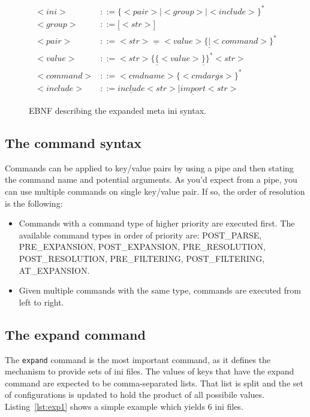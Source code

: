 \documentclass[11pt]{article}
\begin{document}
\begin{figure}
\begin{align*}
 <ini> & ::= \{<pair> | <group> | <include> \}^* \\
 <group> & ::= \underline{[}<str>\underline{]} \\
 <pair> & ::= <str>\underline{ = }<value>\{\underline{|} <command>\}^* \\
 <value> & ::= <str>\{\underline{\{}<value>\underline{\}}\}^*<str> \\
 <command> & ::= <cmdname> \{<cmdargs>\}^* \\
 <include> & ::= \underline{include} <str> | \underline{import} <str>
\end{align*}
\caption{EBNF describing the expanded meta ini syntax.}
\label{fig:metaebnf}
\end{figure}

\subsection{The command syntax}

Commands can be applied to key/value pairs by using a pipe and then stating the command name and potential arguments. As you'd expect from a pipe, you can use multiple commands on single key/value pair. If so, the order of resolution is the following:
\begin{itemize}
 \item Commands with a command type of higher priority are executed first. The available command types in order of priority are: POST\_PARSE, PRE\_EXPANSION, POST\_EXPANSION, PRE\_RESOLUTION, POST\_RESOLUTION, PRE\_FILTERING, POST\_FILTERING, AT\_EXPANSION.
 \item Given multiple commands with the same type, commands are executed from left to right.
\end{itemize}

\subsection{The expand command}

The \lstinline!expand! command is the most important command, as it defines the mechanism to provide sets of ini files. The values of keys that have the expand command are expected to be comma-separated lists. That list is split and the set of configurations is updated to hold the product of all possibile values. Listing~\ref{lst:exp1} shows a simple example which yields 6 ini files.
\end{document}
